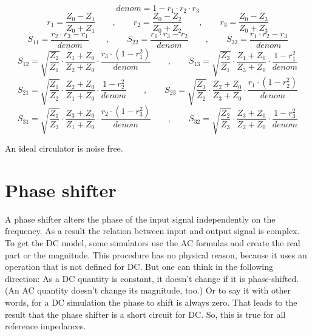 \begin{equation}
denom = 1-r_1\cdot r_2\cdot r_3
\end{equation}
\begin{equation}
r_1 = \frac{Z_0-Z_1}{Z_0+Z_1} \qquad,\qquad 
r_2 = \frac{Z_0-Z_2}{Z_0+Z_2} \qquad,\qquad 
r_3 = \frac{Z_0-Z_3}{Z_0+Z_3}
\end{equation}
\begin{equation}
S_{11} = \frac{r_2\cdot r_3 - r_1}{denom} \qquad,\qquad
S_{22} = \frac{r_1\cdot r_3 - r_2}{denom} \qquad,\qquad 
S_{33} = \frac{r_1\cdot r_2 - r_3}{denom}
\end{equation}
\begin{equation}
S_{12} = \sqrt{\frac{Z_2}{Z_1}}\cdot\frac{Z_1+Z_0}{Z_2+Z_0}\cdot\frac{r_3\cdot(1-r_1^2)}{denom}
\qquad,\qquad 
S_{13} = \sqrt{\frac{Z_3}{Z_1}}\cdot\frac{Z_1+Z_0}{Z_3+Z_0}\cdot\frac{1-r_1^2}{denom}
\end{equation}
\begin{equation}
S_{21} = \sqrt{\frac{Z_1}{Z_2}}\cdot\frac{Z_2+Z_0}{Z_1+Z_0}\cdot\frac{1-r_2^2}{denom}
\qquad,\qquad 
S_{23} = \sqrt{\frac{Z_3}{Z_2}}\cdot\frac{Z_2+Z_0}{Z_3+Z_0}\cdot\frac{r_1\cdot(1-r_2^2)}{denom}
\end{equation}
\begin{equation}
S_{31} = \sqrt{\frac{Z_1}{Z_3}}\cdot\frac{Z_3+Z_0}{Z_1+Z_0}\cdot\frac{r_2\cdot(1-r_3^2)}{denom}
\qquad,\qquad 
S_{32} = \sqrt{\frac{Z_2}{Z_3}}\cdot\frac{Z_3+Z_0}{Z_2+Z_0}\cdot\frac{1-r_3^2}{denom}
\end{equation}

An ideal circulator is noise free.


\section{Phase shifter}

A phase shifter alters the phase of the input signal independently on
the frequency.  As a result the relation between input and output
signal is complex.  To get the DC model, some simulators use the AC
formulas and create the real part or the magnitude.  This procedure
has no physical reason, because it uses an operation that is not
defined for DC.  But one can think in the following direction: As a DC
quantity is constant, it doesn't change if it is phase-shifted.  (An
AC quantity doesn't change its magnitude, too.)  Or to say it with
other words, for a DC simulation the phase to shift is always zero.
That leads to the result that the phase shifter is a short circuit for
DC.  So, this is true for all reference impedances.


